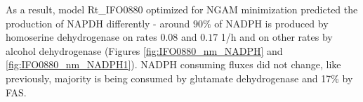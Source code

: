 As a result, model Rt\_IFO0880 optimized for NGAM minimization predicted the production of NAPDH differently - around $90\%$ of NADPH is produced by homoserine dehydrogenase on rates $0.08$ and $0.17$ \unit{1/h} and on other rates by alcohol dehydrogenase (Figures \ref{fig:IFO0880_nm_NADPH} and \ref{fig:IFO0880_nm_NADPH1}). NADPH consuming fluxes did not change, like previously, majority is being consumed by glutamate dehydrogenase and 17\% by FAS.  


